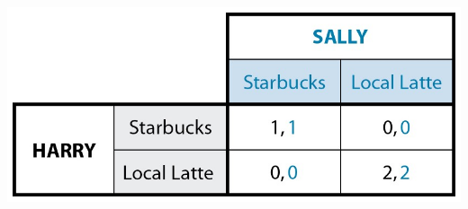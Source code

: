 \documentclass[10pt]{beamer}
\begin{document}
\begin{frame}[label={sec:org83a93f4}]{}
\begin{center}
\includegraphics[width=.75\textwidth]{./img/GAMES4_FIG08.03.jpg}
\end{center}
\end{frame}
\end{document}
